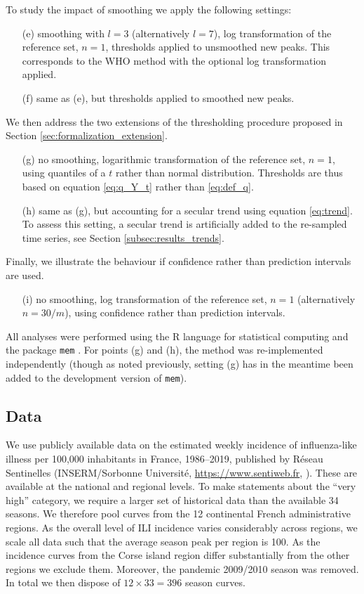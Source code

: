 \documentclass[12pt]{article}
\begin{document}
\noindent To study the impact of smoothing we apply the following settings:
\begin{enumerate}
\item[(e)] smoothing with $l = 3$ (alternatively $l = 7$), log transformation of the reference set, $n = 1$, thresholds applied to unsmoothed new peaks. This corresponds to the WHO method with the optional log transformation applied.
\item[(f)] same as (e), but thresholds applied to smoothed new peaks.
\end{enumerate}
We then address the two extensions of the thresholding procedure proposed in Section \ref{sec:formalization_extension}.
\begin{enumerate}
\item[(g)] no smoothing, logarithmic transformation of the reference set, $n = 1$, using quantiles of a $t$ rather than normal distribution. Thresholds are thus based on equation \eqref{eq:q_Y_t} rather than \eqref{eq:def_q}.
\item[(h)] same as (g), but accounting for a secular trend using equation \eqref{eq:trend}. To assess this setting, a secular trend is artificially added to the re-sampled time series, see Section \ref{subsec:results_trends}.
\end{enumerate}
Finally, we illustrate the behaviour if confidence rather than prediction intervals are used.
\begin{enumerate}
\item[(i)] no smoothing, log transformation of the reference set, $n = 1$ (alternatively $n = 30/m$), using confidence rather than prediction intervals.
\end{enumerate}
All analyses were performed using the R language for statistical computing \citep{RCT2020} and the package \texttt{mem} \citep{Lozano2020}. For points (g) and (h), the method was re-implemented independently (though as noted previously, setting (g) has in the meantime been added to the development version of \texttt{mem}).

\subsection{Data}
\label{subsec:data}

We use publicly available data on the estimated weekly incidence of influenza-like illness per 100,000 inhabitants in France, 1986--2019, published by Réseau Sentinelles (INSERM/Sorbonne Université, \url{https://www.sentiweb.fr}, \citealt{Flahault2006}). These are available at the national and regional levels. To make statements about the ``very high'' category, we require a larger set of historical data than the available 34 seasons. We therefore pool curves from the 12 continental French administrative regions. As the overall level of ILI incidence varies considerably across regions, we scale all data such that the average season peak per region is 100. As the incidence curves from the Corse island region differ substantially from the other regions we exclude them. Moreover, the pandemic 2009/2010 season was removed. In total we then dispose of $12 \times 33 = 396$ season curves.
\end{document}
